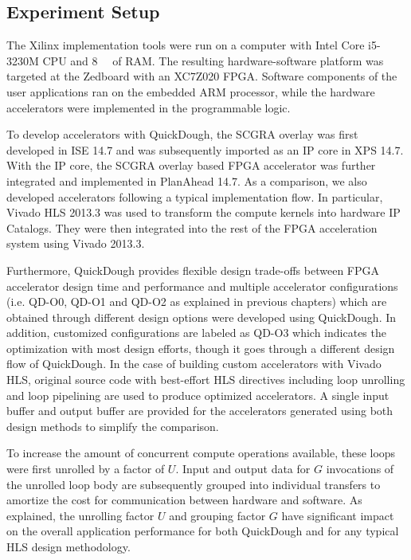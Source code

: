 \subsection{Experiment Setup}
The Xilinx implementation tools were run on a computer with Intel Core i5-3230M CPU and \SI{8}{\giga\byte} of RAM. The resulting hardware-software platform was targeted at the Zedboard with an XC7Z020 FPGA. Software components of the user applications ran on the embedded ARM processor, while the hardware accelerators were implemented in the programmable logic.

To develop accelerators with QuickDough, the SCGRA overlay was first developed in ISE 14.7 and was subsequently imported as an IP core in XPS 14.7. With the IP core, the SCGRA overlay based FPGA accelerator was further integrated and implemented in PlanAhead 14.7. As a comparison, we also developed accelerators following a typical implementation flow. In particular, Vivado HLS 2013.3 was used to transform the compute kernels into hardware IP Catalogs. They were then integrated into the rest of the FPGA acceleration system using Vivado 2013.3.

Furthermore, QuickDough provides flexible design trade-offs between FPGA accelerator design time and performance and multiple accelerator configurations (i.e. QD-O0, QD-O1 and QD-O2 as explained in previous chapters) which are obtained through different design options were developed using QuickDough. In addition, customized configurations are labeled as QD-O3 which indicates the optimization with most design efforts, though it goes through a different design flow of QuickDough. In the case of building custom accelerators with Vivado HLS, original source code with best-effort HLS directives including loop unrolling and loop pipelining are used to produce optimized accelerators. A single input buffer and output buffer are provided for the accelerators generated using both design methods to simplify the comparison. 

To increase the amount of concurrent compute operations available, these loops were first unrolled by a factor of $U$. Input and output data for $G$ invocations of the unrolled loop body are subsequently grouped into individual transfers to amortize the cost for communication between hardware and software. As explained, the unrolling factor $U$ and grouping factor $G$ have significant impact on the overall application performance for both QuickDough and for any typical HLS design methodology.

